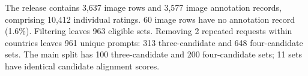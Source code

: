 The release contains 3,637 image rows and 3,577 image annotation records, comprising 10,412 individual ratings. 60 image rows have no annotation record (1.6\%). Filtering leaves 963 eligible sets. Removing 2 repeated requests within countries leaves 961 unique prompts: 313 three-candidate and 648 four-candidate sets. The main split has 100 three-candidate and 200 four-candidate sets; 11 sets have identical candidate alignment scores.
